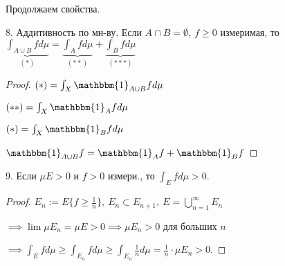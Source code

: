 \begin{properties}
    Продолжаем свойства.

    8. Аддитивность по мн-ву. Если $A \cap B = \emptyset, \ f \geq 0$ измеримая, то 
    $\underbrace{\int_{A\cup B}{f d \mu}}_{(*)} = \underbrace{\int_A{f d \mu}}_{(**)} + \underbrace{\int_B{f d \mu}}_{(***)}$

    \begin{proof}
        $(*) = \int_X{\mathbbm{1}_{A \cup B} f d \mu}$

        $(**) = \int_X{\mathbbm{1}_{A} f d \mu}$

        $(*) = \int_X{\mathbbm{1}_{B} f d \mu}$

        $\mathbbm{1}_{A \cup B} f = \mathbbm{1}_A f + \mathbbm{1}_B f$
    \end{proof}

    9. Если $\mu E > 0$ и $f > 0$ измери., то $\int_E{f d \mu} > 0$.

    \begin{proof}
        $E_n := E \{ f \geq \frac{1}{n} \}, \ E_n \subset E_{n+1}, \ E = \bigcup_{n=1}^{\infty} E_n$

        $\implies \lim{\mu E_n} = \mu E > 0 \implies \mu E_n > 0$ для больших $n$

        $\implies \int_E{f d \mu} \geq \int_{E_n} f d \mu \geq \int_{E_n} {\frac{1}{n} d \mu} = \frac{1}{n} \cdot \mu E_n > 0$.
    \end{proof}
\end{properties}


